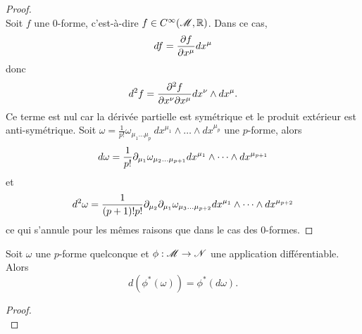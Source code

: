 \documentclass[a4paper,11pt]{report}
\begin{document}
            \begin{proof}${}$\\
                Soit $f$ une $0$-forme, c'est-à-dire $f\in C^\infty(\mathscr{M},\mathbb{R})$. Dans ce cas,
                \begin{equation}
                    df = \pdv{f}{x^\mu}dx^\mu
                \end{equation}
                donc
                \begin{equation}
                    d^2f = \pdv{f}{x^\nu}{x^\mu}dx^\nu\wedge dx^\mu.
                \end{equation}
                Ce terme est nul car la dérivée partielle est symétrique et le produit extérieur est anti-symétrique. Soit $\omega = \frac{1}{p!}\omega_{\mu_1\dots\mu_p}~dx^{\mu_1}\wedge \dots\wedge dx^{\mu_p}$ une $p$-forme, alors
                \begin{equation}
                    d\omega = \frac{1}{p!}\partial_{\mu_1}\omega_{\mu_2\dots\mu_{p+1}} dx^{\mu_1}\wedge \dots\wedge dx^{\mu_{p+1}}
                \end{equation}
                et
                \begin{equation}
                    d^2\omega = \frac{1}{(p+1)!p!}\partial_{\mu_2}\partial_{\mu_1}\omega_{\mu_3\dots\mu_{p+2}} dx^{\mu_1}\wedge \dots\wedge dx^{\mu_{p+2}}
                \end{equation}
                ce qui s'annule pour les mêmes raisons que dans le cas des $0$-formes.
            \end{proof}
            
            \begin{prop}\begin{leftbar}
                Soit $\omega$ une $p$-forme quelconque et $\phi:\mathscr{M}\to\mathscr{N}$ une application différentiable. Alors
                \begin{equation}
                    d(\phi^*(\omega)) = \phi^*(d\omega).
                \end{equation}
            \end{leftbar}\end{prop}
            
            \begin{proof}${}$\\
                \comp
            \end{proof}
            
\end{document}

